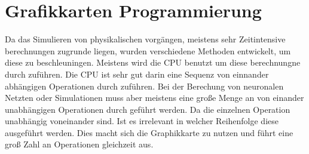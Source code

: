 
\section{Grafikkarten Programmierung} \label{sec:gpu}

Da das Simulieren von physikalischen vorgängen, 
meistens sehr Zeitintensive berechnungen zugrunde liegen, 
wurden verschiedene Methoden entwickelt, 
um diese zu beschleuningen.
Meistens wird die CPU benutzt um diese berechnungne durch zuführen.
Die CPU ist sehr gut darin eine Sequenz von einnander abhängigen Operationen durch zuführen.
Bei der Berechung von neuronalen Netzten oder Simulationen muss aber meistens eine große Menge 
an von einander unabhängigen Operationen durch geführt werden.
Da die einzelnen Operation unabhängig voneinander sind.
Ist es irrelevant in welcher Reihenfolge diese ausgeführt werden.
Dies macht sich die Graphikkarte zu nutzen und führt eine groß Zahl an Operationen gleichzeit aus.






% 